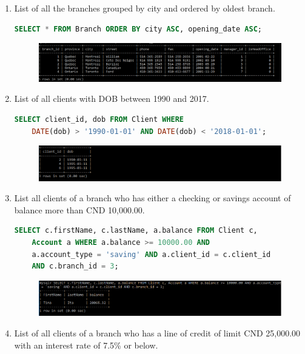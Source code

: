 \documentclass[letterpaper, 12pt]{article}
\begin{document}
\begin{enumerate}[label=\arabic*.]
\begin{figure}[H]
\end{figure}
  \item List of all the branches grouped by city and ordered by oldest branch.
    \begin{lstlisting}[language=sql]
SELECT * FROM Branch ORDER BY city ASC, opening_date ASC;
  \end{lstlisting}
\begin{figure}[H]
  \centering
  \includegraphics[scale=0.6]{images/Query_2.PNG}
\end{figure}
  \item List of all clients with DOB between 1990 and 2017.
    \begin{lstlisting}[language=sql]
SELECT client_id, dob FROM Client WHERE 
	DATE(dob) > '1990-01-01' AND DATE(dob) < '2018-01-01';
  \end{lstlisting}
\begin{figure}[H]
  \centering
  \includegraphics[scale=0.6]{images/Query_3.PNG}
\end{figure}
  \item List all clients of a branch who has either a checking or savings account of balance more than CND 10,000.00.
    \begin{lstlisting}[language=sql]
SELECT c.firstName, c.lastName, a.balance FROM Client c,
	Account a WHERE a.balance >= 10000.00 AND 
	a.account_type = 'saving' AND a.client_id = c.client_id
	AND c.branch_id = 3;
  \end{lstlisting}
\begin{figure}[H]
  \centering
  \includegraphics[scale=0.6]{images/Query_4.PNG}
\end{figure}
  \item List of all clients of a branch who has a line of credit of limit CND 25,000.00 with an interest rate of 7.5\% or below.

\end{enumerate}
\end{document}
